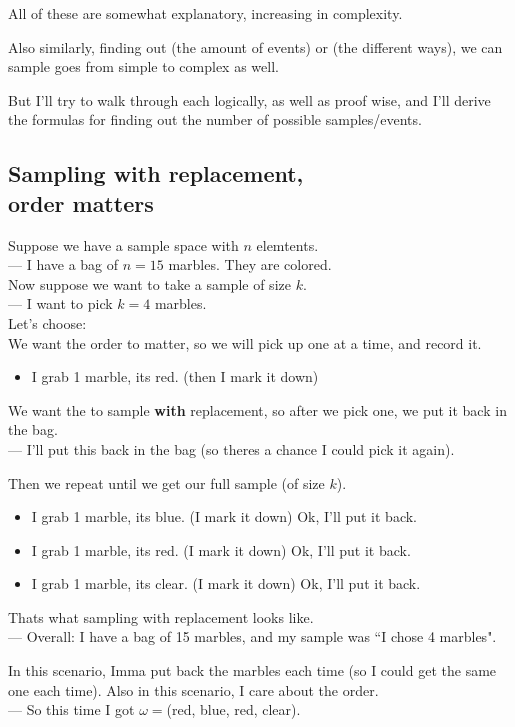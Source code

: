 \documentclass[12pt]{book}
\begin{document}
All of these are somewhat explanatory, increasing in complexity.

Also similarly, finding out (the amount of events) or (the different ways), we can sample goes from simple to complex as well.

But I'll try to walk through each logically, as well as proof wise, and I'll derive the formulas for finding out the number of possible samples/events.





\subsection{Sampling with replacement, \\order matters}
Suppose we have a sample space with $n$ elemtents. \\
--- I have a bag of $n=15$ marbles. They are colored.\\
Now suppose we want to take a sample of size $k$. \\
--- I want to pick $k=4$ marbles.\\

\noindent Let's choose: \\
We want the order to matter, so we will pick up one at a time, and record it.
\begin{itemize}
\item I grab 1 marble, its red. (then I mark it down)
\end{itemize}
We want the to sample \textbf{with} replacement, so after we pick one, we put it back in the bag.\\
--- I'll put this back in the bag (so theres a chance I could pick it again).

\noindent Then we repeat until we get our full sample (of size $k$).
\begin{itemize}
\item I grab 1 marble, its blue. (I mark it down) Ok, I'll put it back.
\item I grab 1 marble, its red. (I mark it down) Ok, I'll put it back. 
\item I grab 1 marble, its clear. (I mark it down) Ok, I'll put it back.
\end{itemize}
Thats what sampling with replacement looks like. \\
--- Overall: I have a bag of 15 marbles, and my sample was ``I chose 4 marbles". 

In this scenario, Imma put back the marbles each time (so I could get the same one each time). Also in this scenario, I care about the order. \\
--- So this time I got $\omega =$(red, blue, red, clear).\\
\end{document}
